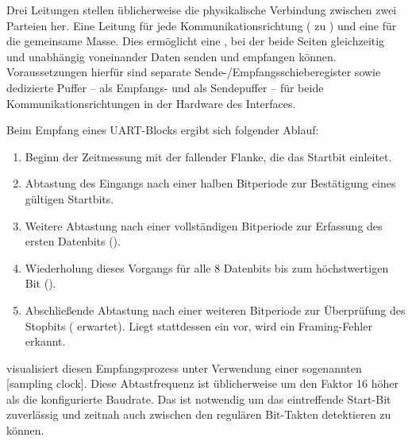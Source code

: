 Drei Leitungen stellen \"ublicherweise die physikalische Verbindung zwischen zwei Parteien her. Eine Leitung f\"ur jede Kommunikationsrichtung ( zu ) und eine f\"ur die gemeinsame Masse. Dies erm\"oglicht eine , bei der beide Seiten gleichzeitig und unabh\"angig voneinander Daten senden und empfangen k\"onnen. Voraussetzungen hierf\"ur sind separate Sende-/Empfangsschieberegister sowie dedizierte Puffer --  als Empfangs- und  als Sendepuffer -- f\"ur beide Kommunikationsrichtungen in der Hardware des Interfaces. \\

\newpage
Beim Empfang eines UART-Blocks ergibt sich folgender Ablauf:

\begin{enumerate}
	\item Beginn der Zeitmessung mit der fallender Flanke, die das Startbit einleitet.
	\item Abtastung des Eingangs nach einer halben Bitperiode zur Best\"atigung eines g\"ultigen Startbits.
	\item Weitere Abtastung nach einer vollst\"andigen Bitperiode zur Erfassung des ersten Datenbits ().
	\item Wiederholung dieses Vorgangs f\"ur alle 8 Datenbits bis zum h\"ochstwertigen Bit ().
	\item Abschlie{\ss}ende Abtastung nach einer weiteren Bitperiode zur \"Uberpr\"ufung des Stopbits ( erwartet). Liegt stattdessen ein  vor, wird ein Framing-Fehler erkannt.
\end{enumerate}

 visualisiert diesen Empfangsprozess unter Verwendung einer sogenannten [sampling clock]. Diese Abtastfrequenz ist \"ublicherweise um den Faktor 16 h\"oher als die konfigurierte Baudrate. Das  ist notwendig um das eintreffende Start-Bit zuverl\"assig und zeitnah auch zwischen den regul\"aren Bit-Takten detektieren zu k\"onnen.

